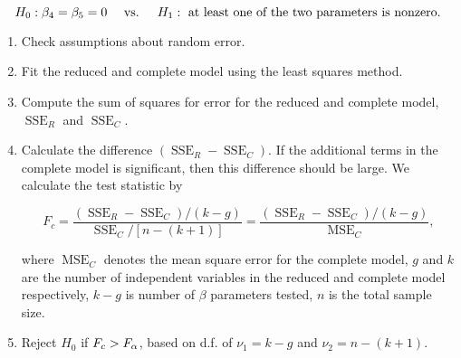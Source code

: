 \documentclass{report}
\DeclareMathOperator{\SSE}{SSE}
\DeclareMathOperator{\MSE}{MSE}
\begin{document}
	$$H_0:\beta_4=\beta_5=0 \quad\text{ vs. }\quad H_1:\text{ at least one of the two parameters is nonzero.}$$
	
	\begin{enumerate}
		\item Check assumptions about random error. 
		\item Fit the reduced and complete model using the least squares method.
		\item Compute the sum of squares for error for the reduced and complete model, $\SSE_R$ and $\SSE_C$.
		\item Calculate the difference $(\SSE_R-\SSE_C)$. If the additional terms in the complete model is significant, then this difference should be large. We calculate the test statistic by
		
		$$F_c=\frac{(\SSE_R-\SSE_C)/(k-g)}{\SSE_C/[n-(k+1)]}=\frac{(\SSE_R-\SSE_C)/(k-g)}{\MSE_C},$$
		
		where $\MSE_C$ denotes the mean square error for the complete model, $g$ and $k$ are the number of independent variables in the reduced and complete model respectively, $k-g$ is number of $\beta$ parameters tested, $n$ is the total sample size.
		\item Reject $H_0$ if $F_c>F_{\alpha}$, based on d.f. of $\nu_1=k-g$ and $\nu_2=n-(k+1)$.
	\end{enumerate}
	\vspace{1mm}
\end{document}

